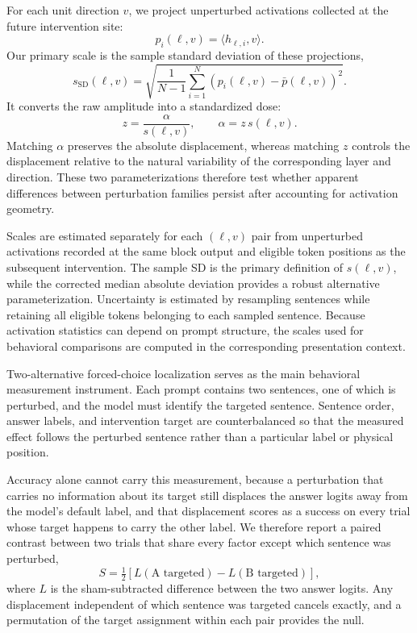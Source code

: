 For each unit direction $v$, we project unperturbed activations collected at
the future intervention site:
\begin{equation}
p_i(\ell,v)=\langle h_{\ell,i},v\rangle.
\label{eq:projection}
\end{equation}
Our primary scale is the sample standard deviation of these projections,
\begin{equation}
s_{\mathrm{SD}}(\ell,v)
=
\sqrt{
\frac{1}{N-1}
\sum_{i=1}^{N}
\left(
p_i(\ell,v)-\bar{p}(\ell,v)
\right)^2
}.
\label{eq:scale}
\end{equation}
It converts the raw amplitude into a standardized dose:
\begin{equation}
z=\frac{\alpha}{s(\ell,v)},
\qquad
\alpha=z\,s(\ell,v).
\label{eq:dose}
\end{equation}
Matching $\alpha$ preserves the absolute displacement, whereas matching $z$
controls the displacement relative to the natural variability of the
corresponding layer and direction. These two parameterizations therefore
test whether apparent differences between perturbation families persist
after accounting for activation geometry.

Scales are estimated separately for each $(\ell,v)$ pair from unperturbed
activations recorded at the same block output and eligible token positions
as the subsequent intervention. The sample SD is the primary definition of
$s(\ell,v)$, while the corrected median absolute deviation provides a robust
alternative parameterization. Uncertainty is estimated by resampling
sentences while retaining all eligible tokens belonging to each sampled
sentence. Because activation statistics can depend on prompt structure,
the scales used for behavioral comparisons are computed in the
corresponding presentation context.

Two-alternative forced-choice localization serves as the main behavioral
measurement instrument. Each prompt contains two sentences, one of which is
perturbed, and the model must identify the targeted sentence. Sentence
order, answer labels, and intervention target are counterbalanced so that
the measured effect follows the perturbed sentence rather than a particular
label or physical position.

Accuracy alone cannot carry this measurement, because a perturbation that
carries no information about its target still displaces the answer logits
away from the model's default label, and that displacement scores as a
success on every trial whose target happens to carry the other label. We
therefore report a paired contrast between two trials that share every factor
except which sentence was perturbed,
\begin{equation}
S = \tfrac{1}{2}\left[L(\text{A targeted})-L(\text{B targeted})\right],
\label{eq:paired}
\end{equation}
where $L$ is the sham-subtracted difference between the two answer logits.
Any displacement independent of which sentence was targeted cancels exactly,
and a permutation of the target assignment within each pair provides the null.


